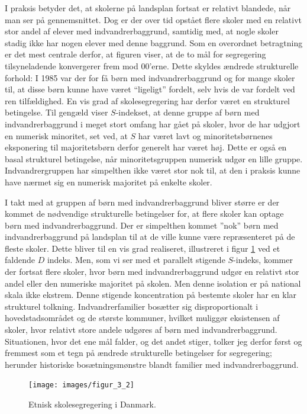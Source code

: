 \documentclass[
]{book}
\begin{document}
I praksis betyder det, at skolerne på landsplan fortsat er relativt blandede, når man ser på gennemsnittet. Dog er der over tid opstået flere skoler med en relativt stor andel af elever med indvandrerbaggrund, samtidig med, at nogle skoler stadig ikke har nogen elever med denne baggrund. Som en overordnet betragtning er det mest centrale derfor, at figuren viser, at de to mål for segregering tilsyneladende konvergerer frem mod 00'erne. Dette skyldes ændrede strukturelle forhold: I 1985 var der for få børn med indvandrerbaggrund og for mange skoler til, at disse børn kunne have været ``ligeligt'' fordelt, selv hvis de var fordelt ved ren tilfældighed. En vis grad af skolesegregering har derfor været en strukturel betingelse. Til gengæld viser \(S\)-indekset, at denne gruppe af børn med indvandrerbaggrund i meget stort omfang har gået på skoler, hvor de har udgjort en numerisk minoritet, set ved, at \(S\) har været lavt og minoritetsbørnenes eksponering til majoritetsbørn derfor generelt har været høj. Dette er også en basal strukturel betingelse, når minoritetsgruppen numerisk udgør en lille gruppe. Indvandrergruppen har simpelthen ikke været stor nok til, at den i praksis kunne have nærmet sig en numerisk majoritet på enkelte skoler.

I takt med at gruppen af børn med indvandrerbaggrund bliver større er der kommet de nødvendige strukturelle betingelser for, at flere skoler kan optage børn med indvandrerbaggrund. Der er simpelthen kommet ''nok'' børn med indvandrerbaggrund på landsplan til at de ville kunne være repræsenteret på de fleste skoler. Dette bliver til en vis grad realiseret, illustreret i figur \ref{fig:fig-4-2} ved et faldende \(D\) indeks. Men, som vi ser med et parallelt stigende \(S\)-indeks, kommer der fortsat flere skoler, hvor børn med indvandrerbaggrund udgør en relativt stor andel eller den numeriske majoritet på skolen. Men denne isolation er på national skala ikke ekstrem. Denne stigende koncentration på bestemte skoler har en klar strukturel tolkning. Indvandrerfamilier bosætter sig disproportionalt i hovedstadsområdet og de største kommuner, hvilket muliggør eksistensen af skoler, hvor relativt store andele udgøres af børn med indvandrerbaggrund. Situationen, hvor det ene mål falder, og det andet stiger, tolker jeg derfor først og fremmest som et tegn på ændrede strukturelle betingelser for segregering; herunder historiske bosætningsmønstre blandt familier med indvandrerbaggrund.

\begin{figure}
\texttt{[image: images/figur\_3\_2]} \caption{Etnisk skolesegregering i Danmark.}\label{fig:fig-4-2}
\end{figure}
\end{document}
